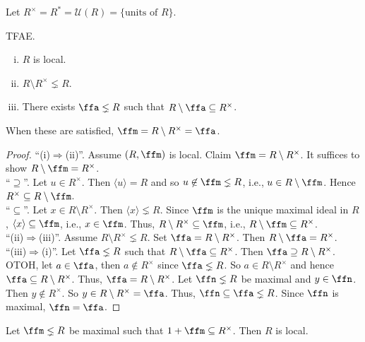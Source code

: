\begin{notation}
    Let $R^\times = R^* =  \mathcal U(R) = \{\text{units of }R\}$.
\end{notation}

\begin{proposition}
    TFAE.
    \begin{enumerate}[(i)]
        \item $R$ is local.
        \item $R \setminus R^\times \lneq R$.
        \item There exists $\ffa \lneq R$ such that $R \setminus \ffa \subseteq R^\times$.
    \end{enumerate}
    When these are satisfied, $\ffm = R \setminus R^\times = \ffa$.
\end{proposition}

\begin{proof}
    ``(i)$\Rightarrow$(ii)''. Assume $(R,\ffm)$ is local. Claim $\ffm = R \setminus R^\times$. It suffices to show $R \setminus \ffm = R^\times$. \\
    ``$\supseteq$''. Let $u \in R^\times$. Then $\langle u \rangle = R$ and so $u \not \in \ffm \lneq R$, i.e., $u \in R \setminus \ffm$. Hence $R^\times \subseteq R \setminus \ffm$. \\
    ``$\subseteq$''. Let $x \in R \setminus R^\times$. Then $\langle x \rangle \lneq R$. Since $\ffm$ is the unique maximal ideal in $R$, $\langle x \rangle \subseteq \ffm$, i.e., $x \in \ffm$. Thus, $R \setminus R^\times \subseteq \ffm$, i.e., $R \setminus \ffm \subseteq R^\times$. \\
    ``(ii)$\Rightarrow$(iii)''. Assume $R \setminus R^\times \lneq R$. Set $\ffa = R \setminus R^\times$. Then $R \setminus \ffa = R^\times$. \\
    ``(iii)$\Rightarrow$(i)''. Let $\ffa \lneq R$ such that $R \setminus \ffa \subseteq R^\times $. Then $\ffa \supseteq R \setminus R^\times$. OTOH, let $a \in \ffa$, then $a \not \in R^\times$ since $\ffa \lneq R$. So $a \in R \setminus R^\times$ and hence $\ffa \subseteq R \setminus R^\times$. Thus, $\ffa = R \setminus R^\times$. Let $\ffn \lneq R$ be maximal and $y \in \ffn$. Then $y \not \in R^\times$. So $y \in R \setminus R^\times = \ffa$. Thus, $\ffn \subseteq \ffa \lneq R$. Since $\ffn$ is maximal, $\ffn = \ffa$. 
\end{proof}

\begin{proposition}
    Let $\ffm \lneq R$ be maximal such that $1 + \ffm \subseteq R^\times$. Then $R$ is local.
\end{proposition}


